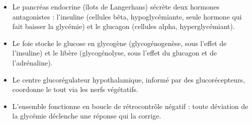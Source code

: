 \documentclass[11pt]{article}
\newcommand{\cle}[1]{{\popxbold\color{popdark}#1}}
\begin{document}
\begin{aretenir}
\begin{itemize}
\item Le \cle{pancréas endocrine} (îlots de Langerhans) sécrète deux hormones antagonistes : l'\cle{insuline} (cellules bêta, hypoglycémiante, seule hormone qui fait baisser la glycémie) et le \cle{glucagon} (cellules alpha, hyperglycémiant).
\item Le \cle{foie} stocke le glucose en glycogène (glycogénogenèse, sous l'effet de l'insuline) et le libère (glycogénolyse, sous l'effet du glucagon et de l'adrénaline).
\item Le \cle{centre glucorégulateur hypothalamique}, informé par des glucorécepteurs, coordonne le tout via les nerfs végétatifs.
\item L'ensemble fonctionne en \cle{boucle de rétrocontrôle négatif} : toute déviation de la glycémie déclenche une réponse qui la corrige.
\end{itemize}
\end{aretenir}
\end{document}
